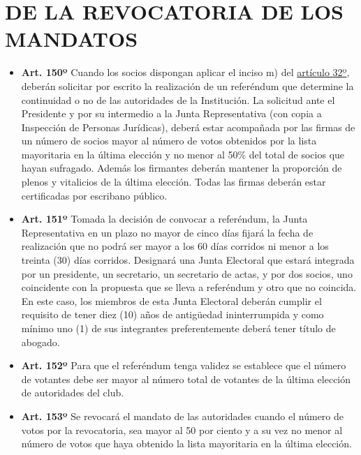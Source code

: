 \documentclass[]{book}
\providecommand{\tightlist}{%
  \setlength{\itemsep}{0pt}\setlength{\parskip}{0pt}}
\begin{document}
\hypertarget{cap25}{%
\chapter{DE LA REVOCATORIA DE LOS MANDATOS}\label{cap25}}

\begin{itemize}
\tightlist
\item
  \textbf{Art. 150º}
  Cuando los socios dispongan aplicar el inciso m) del \protect\hyperlink{art32}{artículo 32º}, deberán solicitar por escrito la realización de un referéndum que determine la continuidad o no de las autoridades de la Institución. La solicitud ante el Presidente y por su intermedio a la Junta Representativa (con copia a Inspección de Personas Jurídicas), deberá estar acompañada por las firmas de un número de socios mayor al número de votos obtenidos por la lista mayoritaria en la última elección y no menor al 50\% del total de socios que hayan sufragado. Además los firmantes deberán mantener la proporción de plenos y vitalicios de la última elección. Todas las firmas deberán estar certificadas por escribano público.
\end{itemize}

\begin{itemize}
\tightlist
\item
  \textbf{Art. 151º}
  Tomada la decisión de convocar a referéndum, la Junta Representativa en un plazo no mayor de cinco días fijará la fecha de realización que no podrá ser mayor a los 60 días corridos ni menor a los treinta (30) días corridos. Designará una Junta Electoral que estará integrada por un presidente, un secretario, un secretario de actas, y por dos socios, uno coincidente con la propuesta que se lleva a referéndum y otro que no coincida. En este caso, los miembros de esta Junta Electoral deberán cumplir el requisito de tener diez (10) años de antigüedad ininterrumpida y como mínimo uno (1) de sus integrantes preferentemente deberá tener título de abogado.
\end{itemize}

\begin{itemize}
\tightlist
\item
  \textbf{Art. 152º}
  Para que el referéndum tenga validez se establece que el número de votantes debe ser mayor al número total de votantes de la última elección de autoridades del club.
\end{itemize}

\begin{itemize}
\tightlist
\item
  \textbf{Art. 153º}
  Se revocará el mandato de las autoridades cuando el número de votos por la revocatoria, sea mayor al 50 por ciento y a su vez no menor al número de votos que haya obtenido la lista mayoritaria en la última elección.
\end{itemize}
\end{document}
